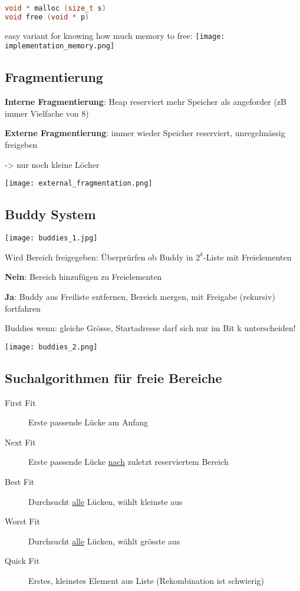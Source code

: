 \begin{multicols*}{4}
\begin{lstlisting}[language=c]
void * malloc (size_t s)
void free (void * p)
\end{lstlisting}

easy variant for knowing how much memory to free:
\texttt{[image: implementation\_memory.png]}

\subsection{Fragmentierung}
\textbf{Interne Fragmentierung}: Heap reserviert mehr Speicher als angeforder (zB immer Vielfache von 8)

\textbf{Externe Fragmentierung}: immer wieder Speicher reserviert, unregelmässig freigeben

-> nur noch kleine Löcher

\texttt{[image: external\_fragmentation.png]}

\subsection{Buddy System}

\texttt{[image: buddies\_1.jpg]}

Wird Bereich freigegeben: Überprürfen ob Buddy in \(2^k\)-Liste mit Freielementen

\textbf{Nein}: Bereich hinzufügen zu Freielementen

\textbf{Ja}: Buddy aus Freiliste entfernen, Bereich mergen, mit Freigabe (rekursiv) fortfahren

Buddies wenn: gleiche Grösse, Startadresse darf sich nur im Bit k unterscheiden!

\hfill\texttt{[image: buddies\_2.png]}

\subsection{Suchalgorithmen für freie Bereiche}
\begin{description}
    \item[First Fit] Erste passende Lücke am Anfang
    \item[Next Fit] Erste passende Lücke \underline{nach} zuletzt reserviertem Bereich
    \item[Best Fit] Durchsucht \underline{alle} Lücken, wählt kleinste aus
    \item[Worst Fit] Durchsucht \underline{alle} Lücken, wählt grösste aus
    \item[Quick Fit] Erstes, kleinstes Element aus Liste
    (Rekombination ist schwierig)
\end{description}


\end{multicols*}

